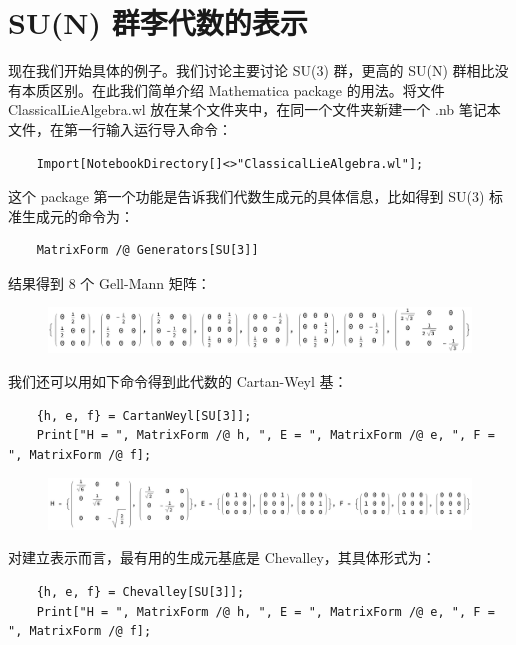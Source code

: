 \documentclass[UTF8]{ctexart}
\begin{document}
\section*{SU(N) 群李代数的表示}
\noindent 现在我们开始具体的例子。我们讨论主要讨论 SU(3) 群，更高的 SU(N) 群相比没有本质区别。在此我们简单介绍 Mathematica package 的用法。将文件ClassicalLieAlgebra.wl 放在某个文件夹中，在同一个文件夹新建一个 .nb 笔记本文件，在第一行输入运行导入命令：
\begin{verbatim}
	Import[NotebookDirectory[]<>"ClassicalLieAlgebra.wl"];
\end{verbatim}
这个 package 第一个功能是告诉我们代数生成元的具体信息，比如得到 SU(3) 标准生成元的命令为：
\begin{verbatim}
	MatrixForm /@ Generators[SU[3]]
\end{verbatim}
结果得到 8 个 Gell-Mann 矩阵：

\begin{figure}[H]
\begin{centering}
\includegraphics[width=0.95\linewidth]{include/O1}
\par\end{centering}
\end{figure}

\noindent 我们还可以用如下命令得到此代数的 Cartan-Weyl 基：
\begin{verbatim}
	{h, e, f} = CartanWeyl[SU[3]];
	Print["H = ", MatrixForm /@ h, ", E = ", MatrixForm /@ e, ", F = ", MatrixForm /@ f];
\end{verbatim}

\begin{figure}[H]
\noindent \includegraphics[width=0.95\linewidth]{include/O2}
\end{figure}

\noindent 对建立表示而言，最有用的生成元基底是 Chevalley，其具体形式为：

\begin{verbatim}
	{h, e, f} = Chevalley[SU[3]];
	Print["H = ", MatrixForm /@ h, ", E = ", MatrixForm /@ e, ", F = ", MatrixForm /@ f];
\end{verbatim}
\end{document}
